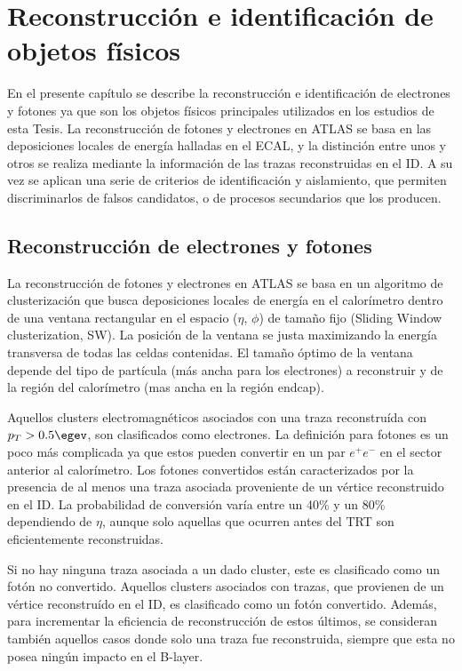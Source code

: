 \chapter{Reconstrucción e identificación de objetos físicos}


En el presente capítulo se describe la reconstrucción e identificación de electrones y fotones ya que son los objetos físicos principales utilizados en los estudios de esta Tesis.
La reconstrucción de fotones y electrones en ATLAS se basa en las deposiciones locales de energía halladas en el ECAL, y la distinción entre unos y otros se   realiza mediante la información de las trazas reconstruidas en el ID. A su vez se aplican una serie de criterios de identificación y aislamiento, que permiten discriminarlos de falsos candidatos, o de procesos secundarios que los producen.

\section{Reconstrucción de electrones y fotones}

La  reconstrucción de fotones y electrones en ATLAS se basa en un algoritmo de clusterización \cite{Lampl:1099735} que busca deposiciones locales de energía en el calorímetro dentro de una ventana rectangular en el espacio ($\eta$, $\phi$) de tamaño fijo (Sliding Window clusterization, SW). La posición de la ventana se  justa maximizando la energía transversa de todas las celdas contenidas. El tamaño óptimo de la ventana depende del tipo de partícula (más ancha para los electrones) a reconstruir y de la región del calorímetro (mas ancha en la región endcap). 

Aquellos clusters electromagnéticos asociados con una traza reconstruída con $p_{T} > 0.5 \egev$, son clasificados como electrones. La definición para fotones es un poco más complicada ya que estos pueden convertir en un par $e^{+}e^{-}$ en el sector anterior al calorímetro. Los fotones convertidos están caracterizados por la presencia de al menos una traza asociada proveniente de un vértice reconstruido en el ID. La probabilidad de conversión varía entre un 40\% y un 80\% dependiendo de $\eta$, aunque solo aquellas que ocurren antes del TRT son eficientemente reconstruidas. 

Si no hay ninguna traza asociada a un dado cluster, este es clasificado como un fotón no convertido. Aquellos clusters asociados con trazas, que provienen de un vértice reconstruído en el ID, es clasificado como un fotón convertido. Además, para incrementar la eficiencia de reconstrucción de estos últimos, se consideran también aquellos casos donde solo una traza fue reconstruida, siempre que esta no posea ningún impacto en el B-layer.

